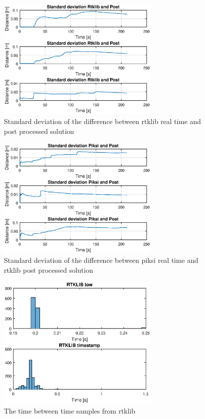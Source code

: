 \begin{figure}[H]
	\centering
		\includegraphics[width=0.7\textwidth]{figs/plots/stdrtkpost.eps}
		\caption{Standard deviation of the difference between rtklib real time and post processed solution}
		\label{figure:RTKLIB_STRUCTURE}
\end{figure}
\begin{figure}[H]
	\centering
		\includegraphics[width=0.7\textwidth]{figs/plots/stdpiksipost.eps}
		\caption{Standard deviation of the difference between piksi real time and rtklib post processed solution}
		\label{figure:RTKLIB_STRUCTURE}
\end{figure}
\begin{figure}[H]
	\centering
		\includegraphics[width=0.7\textwidth]{figs/plots/rtktime.eps}
		\caption{The time between time samples from rtklib}
		\label{figure:RTKLIB_STRUCTURE}
\end{figure}
